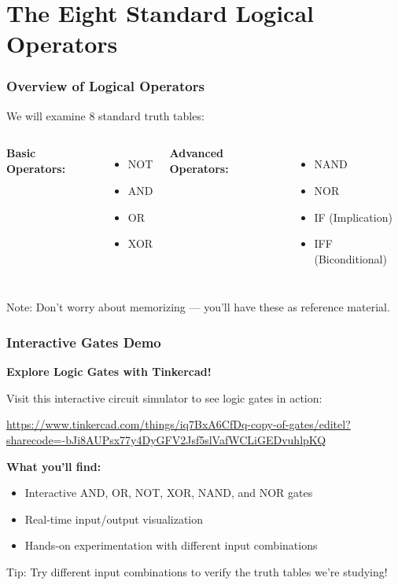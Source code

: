 \documentclass{beamer}
\begin{document}
\section{The Eight Standard Logical Operators}

\begin{frame}
\frametitle{Overview of Logical Operators}
We will examine 8 standard truth tables:\pause

\begin{columns}
\textbf{Basic Operators:}
\begin{itemize}
    \item NOT\pause
    \item AND\pause
    \item OR\pause
    \item XOR
\end{itemize}

\textbf{Advanced Operators:}
\begin{itemize}
    \item NAND\pause
    \item NOR\pause
    \item IF (Implication)\pause
    \item IFF (Biconditional)
\end{itemize}
\end{columns}

\vspace{0.3cm}
\alert{Note:} Don't worry about memorizing --- you'll have these as reference material.
\end{frame}

\begin{frame}
\frametitle{Interactive Gates Demo}
\textbf{Explore Logic Gates with Tinkercad!}

\vspace{0.3cm}
Visit this interactive circuit simulator to see logic gates in action:

\vspace{0.3cm}
\begin{center}
\url{https://www.tinkercad.com/things/iq7BxA6CfDq-copy-of-gates/editel?sharecode=-bJi8AUPsx77y4DyGFV2Jsf5slVafWCLiGEDvuhlpKQ}
\end{center}

\vspace{0.3cm}
\textbf{What you'll find:}
\begin{itemize}
    \item Interactive AND, OR, NOT, XOR, NAND, and NOR gates
    \item Real-time input/output visualization
    \item Hands-on experimentation with different input combinations
\end{itemize}

\vspace{0.3cm}
\alert{Tip:} Try different input combinations to verify the truth tables we're studying!
\end{frame}
\end{document}
